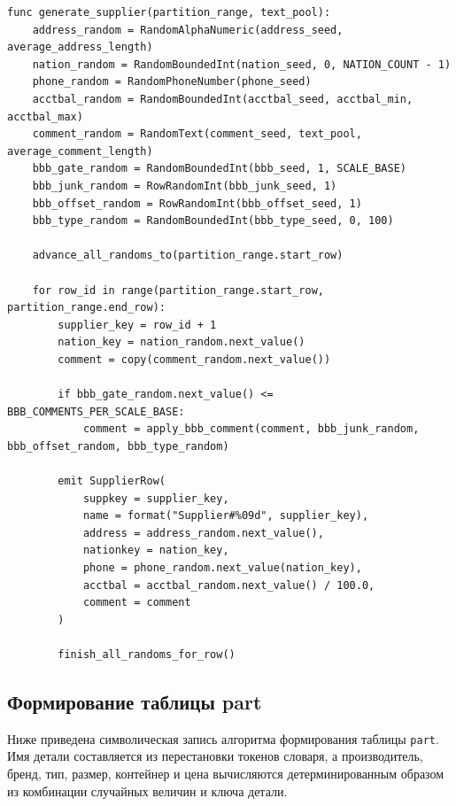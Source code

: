 \begin{lstlisting}[caption={Формирование таблицы supplier}]
func generate_supplier(partition_range, text_pool):
    address_random = RandomAlphaNumeric(address_seed, average_address_length)
    nation_random = RandomBoundedInt(nation_seed, 0, NATION_COUNT - 1)
    phone_random = RandomPhoneNumber(phone_seed)
    acctbal_random = RandomBoundedInt(acctbal_seed, acctbal_min, acctbal_max)
    comment_random = RandomText(comment_seed, text_pool, average_comment_length)
    bbb_gate_random = RandomBoundedInt(bbb_seed, 1, SCALE_BASE)
    bbb_junk_random = RowRandomInt(bbb_junk_seed, 1)
    bbb_offset_random = RowRandomInt(bbb_offset_seed, 1)
    bbb_type_random = RandomBoundedInt(bbb_type_seed, 0, 100)

    advance_all_randoms_to(partition_range.start_row)

    for row_id in range(partition_range.start_row, partition_range.end_row):
        supplier_key = row_id + 1
        nation_key = nation_random.next_value()
        comment = copy(comment_random.next_value())

        if bbb_gate_random.next_value() <= BBB_COMMENTS_PER_SCALE_BASE:
            comment = apply_bbb_comment(comment, bbb_junk_random, bbb_offset_random, bbb_type_random)

        emit SupplierRow(
            suppkey = supplier_key,
            name = format("Supplier#%09d", supplier_key),
            address = address_random.next_value(),
            nationkey = nation_key,
            phone = phone_random.next_value(nation_key),
            acctbal = acctbal_random.next_value() / 100.0,
            comment = comment
        )

        finish_all_randoms_for_row()
\end{lstlisting}

\subsection{Формирование таблицы part}

Ниже приведена символическая запись алгоритма формирования таблицы
\texttt{part}. Имя детали составляется из перестановки токенов словаря, а
производитель, бренд, тип, размер, контейнер и цена вычисляются
детерминированным образом из комбинации случайных величин и ключа детали.

